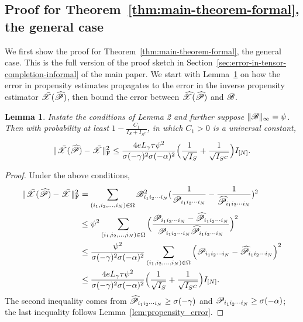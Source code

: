 \documentclass{article}
\newcommand{\T}[2][]{#1\mathscr{\MakeUppercase{#2}}}
\newcommand{\norm}[1]{\Vert #1 \Vert}
\newcommand{\fnorm}[1]{\norm{#1}_{\mathrm{F}}}
\newcommand{\maxnorm}[1]{\norm{#1}_{\infty}}
\def\Ph{\widehat P}
\theoremstyle{plain}
\newtheorem{lemma}[theorem]{Lemma}
\begin{document}
\subsection{Proof for Theorem~\ref{thm:main-theorem-formal}, the general case}
We first show the proof for Theorem~\ref{thm:main-theorem-formal}, the general case. 
This is the full version of the proof sketch in Section~\ref{sec:error-in-tensor-completion-informal} of the main paper.
We start with Lemma~\ref{lem:propensity-error-on-x-bar} on how the error in propensity estimates propagates to the error in the inverse propensity estimator $\bar{\T{X}}(\widehat{\T{P}})$, then bound the error between $\widehat{\T{X}}(\widehat{\T{P}})$ and $\T{B}$.
\begin{lemma}
	\label{lem:propensity-error-on-x-bar}
	Instate the conditions of Lemma 2 and further suppose $\maxnorm{\T{B}} = \psi$.
	Then with probability at least $1 - \frac{C_1}{I_S + I_{S^C}}$, in which $C_1 > 0$ is a universal constant,
	\begin{equation}
		\label{eq:x_bar_error_from_propensity_revisited}
		\fnorm{\bar{\T{X}}(\T{\Ph}) - \bar{\T{X}}}^2 \leq \frac{4 e L_\gamma \tau \psi^2}{\sigma(-\gamma)^2 \sigma(-\alpha)^2} \Big(\frac{1}{\sqrt{I_S}}+\frac{1}{\sqrt{I_{S^C}}}\Big) I_{[N]}.
	\end{equation}
\end{lemma}
\begin{proof}
	Under the above conditions,
	\begin{equation}
		\begin{aligned}
			\fnorm{\bar{\T{X}}(\T{\Ph}) - \bar{\T{X}}}^2 & = \sum_{({i_1, i_2, \dots, i_N}) \in \Omega} \T{B}_{i_1 i_2 \cdots i_N}^2 (\frac{1}{\T{P}_{i_1 i_2 \cdots i_N}} - \frac{1}{\T{\Ph}_{i_1 i_2 \cdots i_N}})^2 \\
			& \leq  \psi^2 \sum_{({i_1, i_2, \dots, i_N}) \in \Omega} \Big(\frac{\T{P}_{i_1 i_2 \cdots i_N} - \T{\Ph}_{i_1 i_2 \cdots i_N}}{\T{P}_{i_1 i_2 \cdots i_N} \T{\Ph}_{i_1 i_2 \cdots i_N}} \Big)^2 \\
			& \leq  \frac{\psi^2}{\sigma(-\gamma)^2 \sigma(-\alpha)^2} \sum_{({i_1, i_2, \dots, i_N}) \in \Omega} \Big(\T{P}_{i_1 i_2 \cdots i_N} - \T{\Ph}_{i_1 i_2 \cdots i_N} \Big)^2 \\
			& \leq \frac{4 e L_\gamma \tau \psi^2}{\sigma(-\gamma)^2 \sigma(-\alpha)^2} \Big(\frac{1}{\sqrt{I_S}}+\frac{1}{\sqrt{I_{S^C}}}\Big) I_{[N]}.
		\end{aligned}
		\nonumber
	\end{equation}
	The second inequality comes from $ \T{\Ph}_{i_1 i_2 \cdots i_N} \geq \sigma(-\gamma)$ and $ \T{P}_{i_1 i_2 \cdots i_N} \geq \sigma(-\alpha)$; the last inequality follows Lemma~\ref{lem:propensity_error}.
\end{proof}
\end{document}
